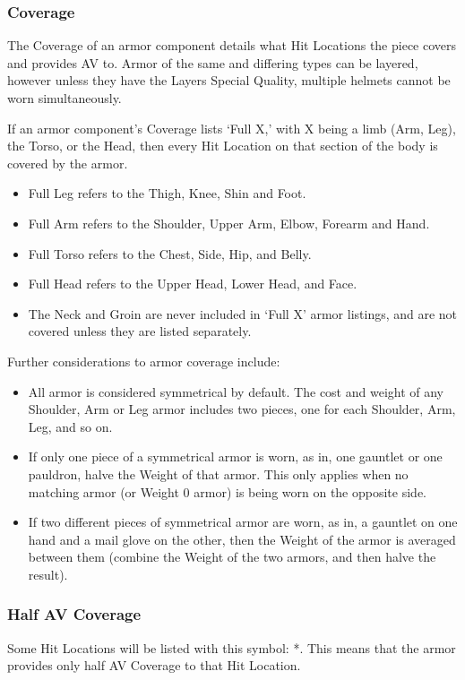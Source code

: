 \documentclass[oneside,11pt,english]{book}
\begin{document}
\subsubsection{Coverage}
The Coverage of an armor component details what Hit Locations the piece covers and provides AV to. Armor of the 
same and differing types can be layered, however unless they have the Layers Special Quality, multiple helmets 
cannot be worn simultaneously.

If an armor component’s Coverage lists ‘Full X,’ with X being a limb (Arm, Leg), the Torso, or the Head, then every 
Hit Location on that section of the body is covered by the armor. 

\begin{itemize}
\item Full Leg refers to the Thigh, Knee, Shin and Foot.
\item Full Arm refers to the Shoulder, Upper Arm, Elbow, Forearm and Hand.
\item Full Torso refers to the Chest, Side, Hip, and Belly.
\item Full Head refers to the Upper Head, Lower Head, and Face.
\item The Neck and Groin are never included in ‘Full X’ armor listings, and are not covered unless they are listed 
separately.
\end{itemize}

Further considerations to armor coverage include:
\begin{itemize}
\item All armor is considered symmetrical by default. The cost and weight of any Shoulder, Arm or Leg armor 
includes two pieces, one for each Shoulder, Arm, Leg, and so on.
\item If only one piece of a symmetrical armor is worn, as in, one gauntlet or one pauldron, halve the Weight of 
that armor. This only applies when no matching armor (or Weight 0 armor) is being worn on the opposite 
side.
\item If two different pieces of symmetrical armor are worn, as in, a gauntlet on one hand and a mail glove on 
the other, then the Weight of the armor is averaged between them (combine the Weight of the two armors, and then halve the result).
\end{itemize}

\subsubsection{Half AV Coverage}
Some Hit Locations will be listed with this symbol: *. This means that the armor provides only half AV Coverage to that Hit Location. 
	
\end{document}
